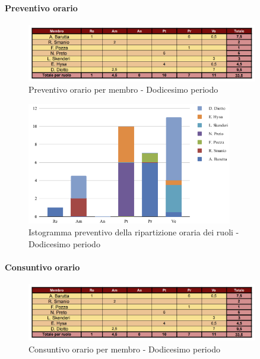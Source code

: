 \paragraph{Preventivo orario}

\begin{figure}[H] 
    \centering
    \includegraphics[width=0.9\textwidth]{../Images/tabPrev12.png}
    \caption{Preventivo orario per membro - Dodicesimo periodo}
    \label{fig:Preventivo_orario_12}
\end{figure}

\begin{figure}[H]
    \centering
    \includegraphics[width=0.8\textwidth]{../Images/graficoConsPrev12.png}
    \caption{Istogramma preventivo della ripartizione oraria dei ruoli - Dodicesimo periodo}
    \label{fig:Preventivo_ripartizione_oraria_12}
\end{figure}

\paragraph{Consuntivo orario}

\begin{figure}[H]
    \centering
    \includegraphics[width=0.9\textwidth]{../Images/tabCons12.png}
    \caption{Consuntivo orario per membro - Dodicesimo periodo}
    \label{fig:Constuntivo_orario_12}
\end{figure}

